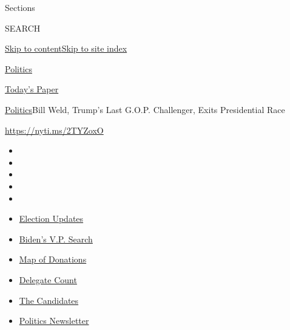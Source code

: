 Sections

SEARCH

\protect\hyperlink{site-content}{Skip to
content}\protect\hyperlink{site-index}{Skip to site index}

\href{https://www.nytimes.com/section/politics}{Politics}

\href{https://myaccount.nytimes.com/auth/login?response_type=cookie\&client_id=vi}{}

\href{https://www.nytimes.com/section/todayspaper}{Today's Paper}

\href{/section/politics}{Politics}\textbar{}Bill Weld, Trump's Last
G.O.P. Challenger, Exits Presidential Race

\url{https://nyti.ms/2TYZoxO}

\begin{itemize}
\item
\item
\item
\item
\item
\end{itemize}

\begin{itemize}
\item
  \href{https://www.nytimes.com/2020/07/31/us/elections/biden-vs-trump.html?action=click\&pgtype=Article\&state=default\&region=TOP_BANNER\&context=storylines_menu}{Election
  Updates}
\item
  \href{https://www.nytimes.com/article/biden-vice-president-2020.html?action=click\&pgtype=Article\&state=default\&region=TOP_BANNER\&context=storylines_menu}{Biden's
  V.P. Search}
\item
  \href{https://www.nytimes.com/interactive/2020/07/24/us/politics/trump-biden-campaign-donors.html?action=click\&pgtype=Article\&state=default\&region=TOP_BANNER\&context=storylines_menu}{Map
  of Donations}
\item
  \href{https://www.nytimes.com/interactive/2020/us/elections/delegate-count-primary-results.html?action=click\&pgtype=Article\&state=default\&region=TOP_BANNER\&context=storylines_menu}{Delegate
  Count}
\item
  \href{https://www.nytimes.com/interactive/2019/us/politics/2020-presidential-candidates.html?action=click\&pgtype=Article\&state=default\&region=TOP_BANNER\&context=storylines_menu}{The
  Candidates}
\item
  \href{https://www.nytimes.com/newsletters/politics?action=click\&pgtype=Article\&state=default\&region=TOP_BANNER\&context=storylines_menu}{Politics
  Newsletter}
\end{itemize}

